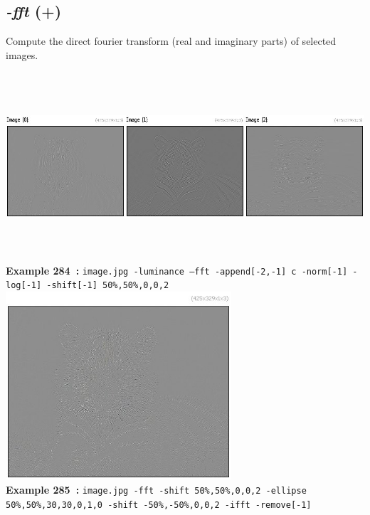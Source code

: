 \documentclass[a4paper,11pt,twoside]{book}
\begin{document}
\subsection{\emph{-fft} (+)}\vspace*{-0.5em}
Compute the direct fourier transform (real and imaginary parts) of selected images.
\begin{center}\includegraphics[keepaspectratio=true,height=7cm,width=\textwidth]{img/gmic_def284.jpg}\\
{\footnotesize \textbf{Example 284~:} \texttt{image.jpg -luminance --fft -append[-2,-1] c -norm[-1] -log[-1] -shift[-1] 50\%,50\%,0,0,2}}
\\\includegraphics[keepaspectratio=true,height=7cm,width=\textwidth]{img/gmic_def285.jpg}\\
{\footnotesize \textbf{Example 285~:} \texttt{image.jpg -fft -shift 50\%,50\%,0,0,2 -ellipse 50\%,50\%,30,30,0,1,0 -shift -50\%,-50\%,0,0,2 -ifft -remove[-1]}}
\end{center}
\end{document}
